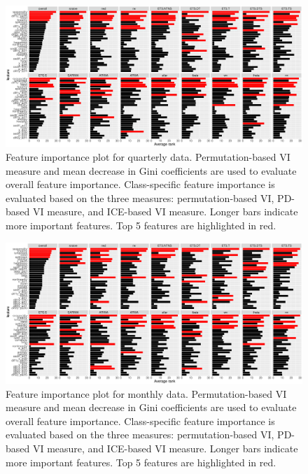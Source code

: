 \documentclass[11pt,a4paper,]{article}
\begin{document}
\begin{figure}[h]

{\centering \includegraphics{figures/viquarterly-1} 

}

\caption{Feature importance plot for quarterly data. Permutation-based VI measure and mean decrease in Gini coefficients are used to evaluate overall feature importance. Class-specific feature importance is evaluated based on the three measures: permutation-based VI, PD-based VI measure, and ICE-based VI measure. Longer bars indicate more important features. Top 5 features are highlighted in red.}\label{fig:viquarterly}
\end{figure}

\begin{figure}[h]

{\centering \includegraphics{figures/vimonthly-1} 

}

\caption{Feature importance plot for monthly data. Permutation-based VI measure and mean decrease in Gini coefficients are used to evaluate overall feature importance. Class-specific feature importance is evaluated based on the three measures: permutation-based VI, PD-based VI measure, and ICE-based VI measure. Longer bars indicate more important features. Top 5 features are highlighted in red.}\label{fig:vimonthly}
\end{figure}
\end{document}
